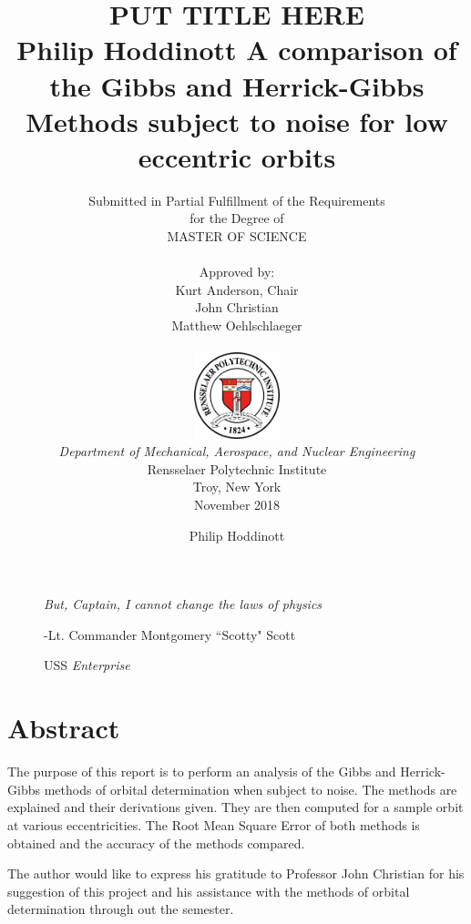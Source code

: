 \documentclass[12pt]{article}
\title{ 
		\LARGE \textbf{\uppercase{Put Title Here}} \\
		\vspace{0.25cm}
		\LARGE \textbf{Philip Hoddinott}
	}
\author{\small{Submitted in Partial Fulfillment of the Requirements} \\ \small{for the Degree of} \\
		\uppercase{Master of Science} \\ \\
		Approved by:
		\\ Kurt Anderson, Chair \\ John Christian \\ Matthew Oehlschlaeger \\ \\ %
		\includegraphics[width=2.5cm]{rensselaer_seal.png} \\
		\small{\textit{Department of Mechanical, Aerospace, and Nuclear Engineering}} \\
		\small{Rensselaer Polytechnic Institute} \\ 
		\small{Troy, New York} \\
		\small{November 2018}
	}
\newlength\longest
\begin{document}
		\title{A comparison of the Gibbs and Herrick-Gibbs Methods subject to noise for low eccentric orbits}
	\author{Philip Hoddinott}
	
	\maketitle
	\thispagestyle{empty}
	\clearpage
	
	\thispagestyle{empty}
	\null\vfill
	
	\begin{figure}[!t]
		\begin{center}
			\settowidth{}
			\parbox{\longest}{%
				\raggedright{\huge\itshape%
					But, Captain, I cannot change the laws of physics\par\bigskip
				}   
				\raggedleft\Large{-Lt. Commander Montgomery ``Scotty" Scott}\par
				\raggedleft\Large{USS}\textit{ Enterprise}\par%
				
			}
		\end{center}
	\end{figure}
	
	
	\null\vfill
	
	\newpage
	\tableofcontents
	
	\newpage


	
	\listoffigures
	
	\newpage
		\doublespacing

	
	
	\newpage
	\section*{Abstract}
	The purpose of this report is to perform an analysis of the Gibbs and Herrick-Gibbs methods of orbital determination when subject to noise. The methods are explained and their derivations given. They are then computed for a sample orbit at various eccentricities. The Root Mean Square Error of both methods is obtained and the accuracy of the methods compared. \par 
	The author would like to express his gratitude to Professor John Christian for his suggestion of this project and his assistance with the methods of orbital determination through out the semester.\par 
	
\end{document}
